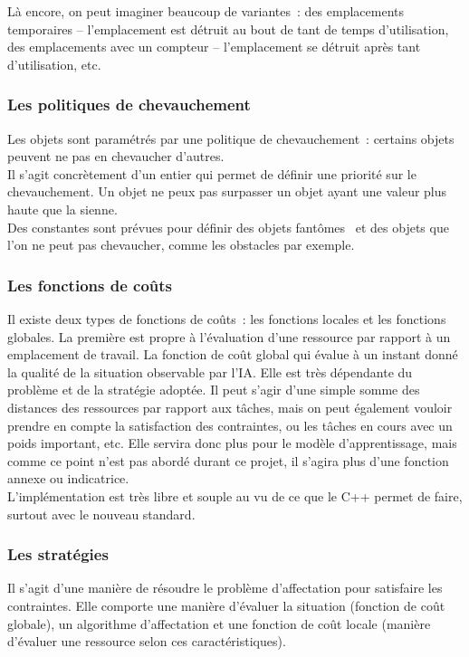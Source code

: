 Là encore, on peut imaginer beaucoup de variantes~: des emplacements temporaires – l'emplacement est détruit au bout de tant de temps d'utilisation, des emplacements avec un compteur – l'emplacement se détruit après tant d'utilisation, etc.

\subsubsection*{Les politiques de chevauchement}

Les objets sont paramétrés par une politique de chevauchement~: certains objets peuvent ne pas en chevaucher d'autres.\\
\indent Il s'agit concrètement d'un entier qui permet de définir une priorité sur le chevauchement. Un objet ne peux pas surpasser un objet ayant une valeur plus haute que la sienne.\\
\indent Des constantes sont prévues pour définir des objets \og fantômes \fg ~et des objets que l'on ne peut pas chevaucher, comme les obstacles par exemple.

\subsubsection*{Les fonctions de coûts}

Il existe deux types de fonctions de coûts~: les fonctions locales et les fonctions globales. La première est propre à l'évaluation d'une ressource par rapport à un emplacement de travail.
La fonction de coût global qui évalue à un instant donné la qualité de la situation observable par l'IA. Elle est très dépendante du problème et de la stratégie adoptée. Il peut s'agir d'une simple somme des distances des ressources par rapport aux tâches, mais on peut également vouloir prendre en compte la satisfaction des contraintes, ou les tâches en cours avec un poids important, etc.
Elle servira donc plus pour le modèle d'apprentissage, mais comme ce point n'est pas abordé durant ce projet, il s'agira plus d'une fonction annexe ou indicatrice.\\

L'implémentation est très libre et souple au vu de ce que le C++ permet de faire, surtout avec le nouveau standard.

\subsubsection*{Les stratégies}

Il s'agit d'une manière de résoudre le problème d'affectation pour satisfaire les contraintes. Elle comporte une manière d'évaluer la situation (fonction de coût globale), un algorithme d'affectation et une fonction de coût locale (manière d'évaluer une ressource selon ces caractéristiques).

